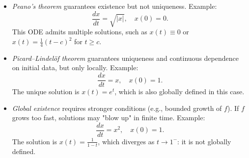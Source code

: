 \begin{itemize}
    \item \emph{Peano’s theorem} guarantees existence but not uniqueness. Example:
    \[
    \frac{dx}{dt} = \sqrt{|x|}, \quad x(0) = 0.
    \]
    This ODE admits multiple solutions, such as \( x(t) \equiv 0 \) or \( x(t) = \frac{1}{4}(t - c)^2 \) for \( t \geq c \).

    \item \emph{Picard–Lindelöf theorem} guarantees uniqueness and continuous dependence on initial data, but only locally. Example:
    \[
    \frac{dx}{dt} = x, \quad x(0) = 1.
    \]
    The unique solution is \( x(t) = e^t \), which is also globally defined in this case.

    \item \emph{Global existence} requires stronger conditions (e.g., bounded growth of \( f \)). If \( f \) grows too fast, solutions may "blow up" in finite time. Example:
    \[
    \frac{dx}{dt} = x^2, \quad x(0) = 1.
    \]
    The solution is \( x(t) = \frac{1}{1 - t} \), which diverges as \( t \to 1^- \): it is not globally defined.
\end{itemize}